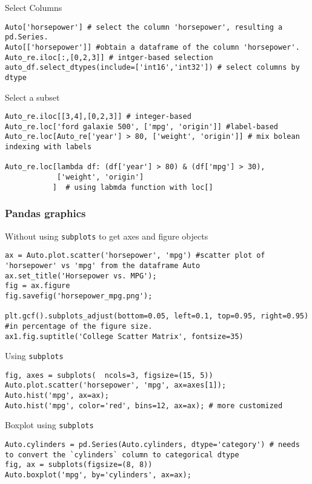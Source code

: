 \documentclass[
  letterpaper,
  DIV=11,
  numbers=noendperiod]{scrreprt}
\begin{document}
Select Columns

\begin{verbatim}
Auto['horsepower'] # select the column 'horsepower', resulting a pd.Series.
Auto[['horsepower']] #obtain a dataframe of the column 'horsepower'. 
Auto_re.iloc[:,[0,2,3]] # intger-based selection
auto_df.select_dtypes(include=['int16','int32']) # select columns by dtype
\end{verbatim}

Select a subset

\begin{verbatim}
Auto_re.iloc[[3,4],[0,2,3]] # integer-based 
Auto_re.loc['ford galaxie 500', ['mpg', 'origin']] #label-based 
Auto_re.loc[Auto_re['year'] > 80, ['weight', 'origin']] # mix bolean indexing with labels

Auto_re.loc[lambda df: (df['year'] > 80) & (df['mpg'] > 30),
            ['weight', 'origin']
           ]  # using labmda function with loc[]
\end{verbatim}

\subsubsection{Pandas graphics}\label{pandas-graphics}

Without using \texttt{subplots} to get axes and figure objects

\begin{verbatim}
ax = Auto.plot.scatter('horsepower', 'mpg') #scatter plot of 'horsepower' vs 'mpg' from the dataframe Auto
ax.set_title('Horsepower vs. MPG');
fig = ax.figure
fig.savefig('horsepower_mpg.png');

plt.gcf().subplots_adjust(bottom=0.05, left=0.1, top=0.95, right=0.95) #in percentage of the figure size. 
ax1.fig.suptitle('College Scatter Matrix', fontsize=35)
\end{verbatim}

Using \texttt{subplots}

\begin{verbatim}
fig, axes = subplots(  ncols=3, figsize=(15, 5))
Auto.plot.scatter('horsepower', 'mpg', ax=axes[1]);
Auto.hist('mpg', ax=ax);
Auto.hist('mpg', color='red', bins=12, ax=ax); # more customized 
\end{verbatim}

Boxplot using \texttt{subplots}

\begin{verbatim}
Auto.cylinders = pd.Series(Auto.cylinders, dtype='category') # needs to convert the `cylinders` column to categorical dtype
fig, ax = subplots(figsize=(8, 8))
Auto.boxplot('mpg', by='cylinders', ax=ax);
\end{verbatim}
\end{document}
